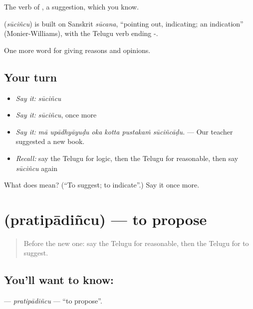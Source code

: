The verb of , a suggestion, which you know.

\begin{cousinweb}
\textbf{} (\emph{sūciñcu}) is built on Sanskrit \emph{sūcana}, \textquotedblleft{}pointing out, indicating; an indication\textquotedblright{} (Monier-Williams), with the Telugu verb ending -.
\end{cousinweb}

\begin{grammarlens}[title={What you've built}]
One more word for giving reasons and opinions.
\end{grammarlens}

\subsection*{Your turn}
\begin{itemize}
\raggedright
  \item \emph{Say it:} \emph{sūciñcu}
  \item \emph{Say it:} \emph{sūciñcu}, once more
  \item \emph{Say it:} \emph{mā upādhyāyuḍu oka kotta pustakaṁ sūciñcāḍu.} — Our teacher suggested a new book.
  \item \emph{Recall:} say the Telugu for logic, then the Telugu for reasonable, then say \emph{sūciñcu} again
\end{itemize}

\begin{tcolorbox}[breakable,colback=teal!4,colframe=teal!35!black,title={Before you move on}]
What does  mean? (\textquotedblleft{}To suggest; to indicate\textquotedblright{}.) Say it once more.
\end{tcolorbox}
\section[\texorpdfstring{\te{ప్రతిపాదించు} (pratipādiñcu)}{ప్రతిపాదించు (pratipādiñcu)}]{ (pratipādiñcu) — to propose}

\label{lesson:TE-C384-pratipadincu}



\begin{quote}
Before the new one: say the Telugu for reasonable, then the Telugu for to suggest.
\end{quote}

\subsection*{You'll want to know: }
\textbf{} — \emph{pratipādiñcu} — \textquotedblleft{}to propose\textquotedblright{}.


